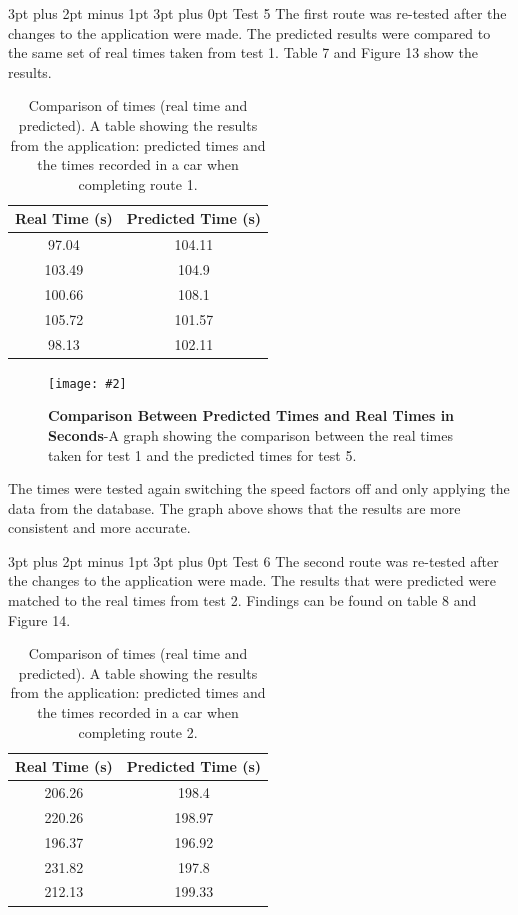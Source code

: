 \documentclass[12pt,a4paper]{article}
\makeatletter
\newcommand{\figuremacro}[5]{
    \begin{figure}[#1]
        \centering
        \texttt{[image: \#2]}
        \caption[#3]{\textbf{#3}#4}
        \label{fig:#2}
    \end{figure}
}
\renewcommand\subsection{\@startsection {subsection}{1}{0mm} %
                               {3pt plus 2pt minus 1pt} %
                               {3pt plus 0pt} %
                               {\normalfont\bfseries}}
\makeatother
\begin{document}
\subsection{Test 5}
The first route was re-tested after the changes to the application were made. The predicted results were compared to the same set of real times taken from test 1. Table 7 and Figure 13 show the results.

\begin{table}[h]
	\centering
	\caption{Comparison of times (real time and predicted). A table showing the results from the application: predicted times and the times recorded in a car when completing route 1.}
	
	\begin{tabular}{@{}cc@{}}
		\toprule
		Real Time (s) & Predicted Time (s) \\ \midrule
		97.04         & 104.11             \\
		103.49        & 104.9              \\
		100.66        & 108.1              \\
		105.72        & 101.57             \\
		98.13         & 102.11             \\ \bottomrule
	\end{tabular}
\end{table}

\figuremacro{h}{graph5}{Comparison Between Predicted Times and Real Times in Seconds}{-A graph showing the comparison between the real times taken for test 1 and the predicted times for test 5.}{0.8}

The times were tested again switching the speed factors off and only applying the data from the database. The graph above shows that the results are more consistent and more accurate.

\subsection{Test 6}
The second route was re-tested after the changes to the application were made. The results that were predicted were matched to the real times from test 2. Findings can be found on table 8 and Figure 14.

\begin{table}[htb]
	\centering
	\caption{Comparison of times (real time and predicted). A table showing the results from the application: predicted times and the times recorded in a car when completing route 2.}
	\begin{tabular}{@{}cc@{}}
		\toprule
		Real Time (s) & Predicted Time (s) \\ \midrule
		206.26        & 198.4            \\
		220.26        & 198.97             \\
		196.37        & 196.92             \\
		231.82        & 197.8             \\
		212.13        & 199.33            \\ \bottomrule
	\end{tabular}
\end{table}
\end{document}
